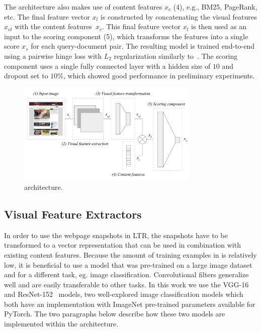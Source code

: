 The \modelname{} architecture also makes use of content features $x_{c}$ (4), e.g., BM25, PageRank, etc.
The final feature vector $x_{l}$ is constructed by concatenating the visual features $x_{vl}$ with the content features~$x_{c}$.
%
This final feature vector $x_{l}$ is then used as an input to the scoring component (5),
which transforms the features into a single score $x_s$ for each query-document pair.
The resulting model is trained end-to-end using a pairwise hinge loss with $L_2$ regularization similarly to~\cite{fan2017learning}.
The scoring component uses a single fully connected layer with a hidden size of $10$ and dropout set to $10\%$,
which showed good performance in preliminary experiments.



\begin{figure}[t]
\includegraphics[width = 3.4in]{images/multimodelarchitecture.pdf}
\caption{\modelname{} architecture.}
\label{fig:multimodelarchitecture}
\end{figure}

\subsection{Visual Feature Extractors} \label{sec:visualfeatures}
In order to use the webpage snapshots in \ac{LTR}, the snapshots have to be transformed to a vector representation that can be used in combination with existing content features. 
Because the amount of training examples in \datasetname{} is relatively low, it is beneficial to use a model that was pre-trained on a large image dataset and for a different task, eg. image classification. Convolutional filters generalize well and are easily transferable to other tasks.  In this work we use the VGG-16~\cite{simonyan2014very} and ResNet-152~\cite{he2016deep} models, two well-explored image classification models which both have an implementation with ImageNet pre-trained parameters available for PyTorch. The two paragraphs below describe how these two models are implemented within the \modelname{} architecture.




